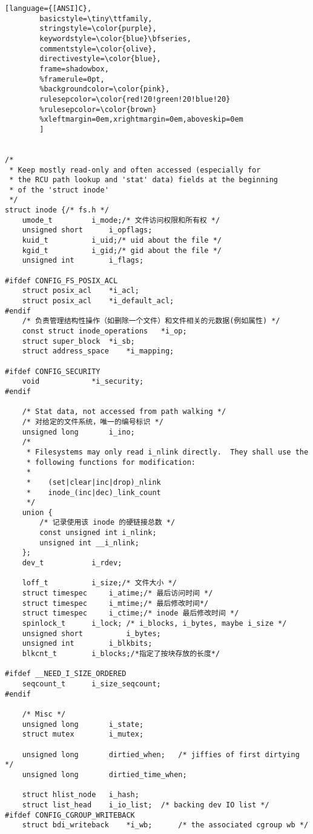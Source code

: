 \begin{lstlisting}[language={[ANSI]C},
        basicstyle=\tiny\ttfamily,
        stringstyle=\color{purple},
        keywordstyle=\color{blue}\bfseries,
        commentstyle=\color{olive},
        directivestyle=\color{blue},
        frame=shadowbox,
        %framerule=0pt,
        %backgroundcolor=\color{pink},
        rulesepcolor=\color{red!20!green!20!blue!20}
        %rulesepcolor=\color{brown}
        %xleftmargin=0em,xrightmargin=0em,aboveskip=0em
        ]


/*
 * Keep mostly read-only and often accessed (especially for
 * the RCU path lookup and 'stat' data) fields at the beginning
 * of the 'struct inode'
 */
struct inode {/* fs.h */
	umode_t			i_mode;/* 文件访问权限和所有权 */
	unsigned short		i_opflags;
	kuid_t			i_uid;/* uid about the file */
	kgid_t			i_gid;/* gid about the file */
	unsigned int		i_flags;

#ifdef CONFIG_FS_POSIX_ACL
	struct posix_acl	*i_acl;
	struct posix_acl	*i_default_acl;
#endif
	/* 负责管理结构性操作（如删除一个文件）和文件相关的元数据(例如属性) */
	const struct inode_operations	*i_op;
	struct super_block	*i_sb;
	struct address_space	*i_mapping;

#ifdef CONFIG_SECURITY
	void			*i_security;
#endif

	/* Stat data, not accessed from path walking */
	/* 对给定的文件系统，唯一的编号标识 */
	unsigned long		i_ino;
	/*
	 * Filesystems may only read i_nlink directly.  They shall use the
	 * following functions for modification:
	 *
	 *    (set|clear|inc|drop)_nlink
	 *    inode_(inc|dec)_link_count
	 */
	union {
		/* 记录使用该 inode 的硬链接总数 */
		const unsigned int i_nlink;
		unsigned int __i_nlink;
	};
	dev_t			i_rdev;
	
	loff_t			i_size;/* 文件大小 */
	struct timespec		i_atime;/* 最后访问时间 */
	struct timespec		i_mtime;/* 最后修改时间*/
	struct timespec		i_ctime;/* inode 最后修改时间 */
	spinlock_t		i_lock;	/* i_blocks, i_bytes, maybe i_size */
	unsigned short          i_bytes;
	unsigned int		i_blkbits;
	blkcnt_t		i_blocks;/*指定了按块存放的长度*/

#ifdef __NEED_I_SIZE_ORDERED
	seqcount_t		i_size_seqcount;
#endif

	/* Misc */
	unsigned long		i_state;
	struct mutex		i_mutex;

	unsigned long		dirtied_when;	/* jiffies of first dirtying */
	unsigned long		dirtied_time_when;

	struct hlist_node	i_hash;
	struct list_head	i_io_list;	/* backing dev IO list */
#ifdef CONFIG_CGROUP_WRITEBACK
	struct bdi_writeback	*i_wb;		/* the associated cgroup wb */


\end{lstlisting}
